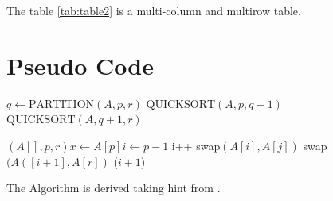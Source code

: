 \documentclass[10pt]{article}
\begin{document}
The table \ref{tab:table2} is a multi-column and multirow table.



\newpage
\pagecolor{white}
\section{Pseudo Code}

\begin{algorithmic}
   \State $q\gets \text{PARTITION}(A,p,r)$ 
   \State $\text{QUICKSORT}(A,p,q-1)$ 
   \State $\text{QUICKSORT}(A,q+1,r)$ 
\EndIf
\EndFunction



$(A[ ],p,r) x\longleftarrow A[p] i \longleftarrow p-1 $
	\State i++
	\State swap$(A[i],A[j])$
	\EndIf
\EndFor
\State swap$(A([i+1],A[r])$
\State \Return ($i+1$)
\EndFunction
\end{algorithmic}
The Algorithm is derived taking hint from \cite{hoare1962quicksort} .

\newpage


\end{document}
